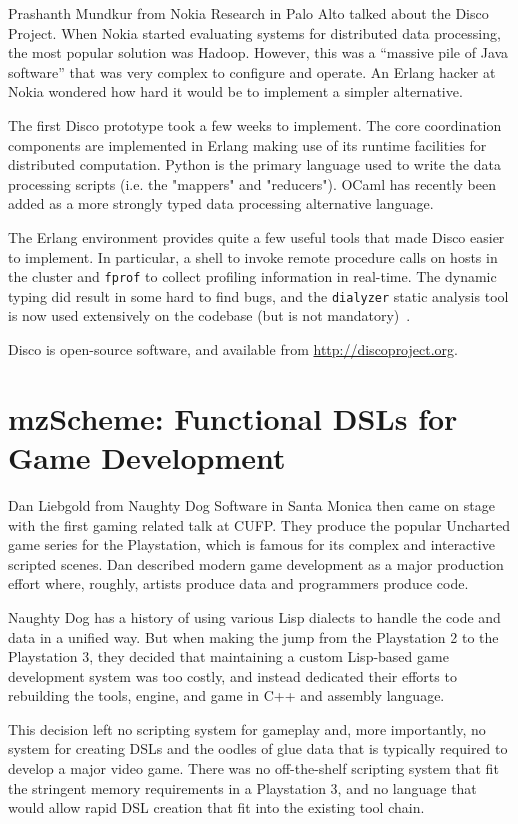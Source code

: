\documentclass{jfp1}
\begin{document}
Prashanth Mundkur from Nokia Research in Palo Alto talked about the Disco
Project.  When Nokia started evaluating systems for distributed data
processing, the most popular solution was Hadoop. However, this was a ``massive
pile of Java software'' that was very complex to configure and operate. An
Erlang hacker at Nokia wondered how hard it would be to implement a simpler
alternative.

The first Disco prototype took a few weeks to implement. The core coordination
components are implemented in Erlang making use of its runtime facilities for
distributed computation. Python is the primary language used to write the data
processing scripts (i.e. the "mappers" and "reducers"). OCaml has recently been
added as a more strongly typed data processing alternative language.

The Erlang environment provides quite a few useful tools that made Disco easier
to implement. In particular, a shell to invoke remote procedure calls on hosts
in the cluster and {\tt fprof} to collect profiling information in real-time.
The dynamic typing did result in some hard to find bugs, and the {\tt dialyzer}
static analysis tool is now used extensively on the codebase (but is not
mandatory)~\cite{Sagonas:2007:DDE:1273920.1273926}.

Disco is open-source software, and available from \url{http://discoproject.org}.

\section{mzScheme: Functional DSLs for Game Development}

Dan Liebgold from Naughty Dog Software in Santa Monica then came on stage with
the first gaming related talk at CUFP. They produce the popular Uncharted game
series for the Playstation, which is famous for its complex and interactive
scripted scenes.  Dan described modern game development as a major production
effort where, roughly, artists produce data and programmers produce code.

Naughty Dog has a history of using various Lisp dialects to handle the code and
data in a unified way. But when making the jump from the Playstation 2 to the
Playstation 3, they decided that maintaining a custom Lisp-based game
development system was too costly, and instead dedicated their efforts to
rebuilding the tools, engine, and game in C++ and assembly language.

This decision left no scripting system for gameplay and, more importantly, no
system for creating DSLs and the oodles of glue data that is typically required
to develop a major video game. There was no off-the-shelf scripting system that
fit the stringent memory requirements in a Playstation 3, and no language that
would allow rapid DSL creation that fit into the existing tool chain.
\end{document}
